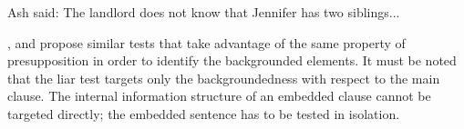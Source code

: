 \begin{exe}
\ex Ash said: The landlord does not know that Jennifer has two siblings...
\label{ex:liar-test}
\begin{xlist}
 \label{ex:liar-test-good}
 \label{ex:liar-test-bad}
\end{xlist}
\end{exe}

\citet[51]{Lambrecht.1994}, \citet{Ambridge.2008} and \citet{Cuneo.2023} propose similar tests that take advantage of the same property of presupposition in order to identify the backgrounded elements. It must be noted that the liar test targets only the backgroundedness with respect to the main clause. The internal information structure of an embedded clause cannot be targeted directly; the embedded sentence has to be tested in isolation.




